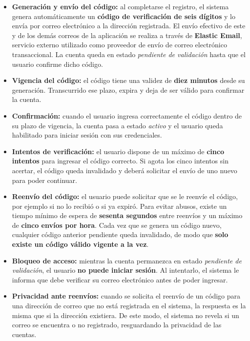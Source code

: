 \documentclass[a4paper,12pt]{article}
\begin{document}
    \begin{itemize}
        \item \textbf{Generación y envío del código:} al completarse el registro, el sistema genera automáticamente un \textbf{código de verificación de seis dígitos} y lo envía por correo electrónico a la dirección registrada. El envío efectivo de este y de los demás correos de la aplicación se realiza a través de \textbf{Elastic Email}, servicio externo utilizado como proveedor de envío de correo electrónico transaccional. La cuenta queda en estado \textit{pendiente de validación} hasta que el usuario confirme dicho código.
        \item \textbf{Vigencia del código:} el código tiene una validez de \textbf{diez minutos} desde su generación. Transcurrido ese plazo, expira y deja de ser válido para confirmar la cuenta.
        \item \textbf{Confirmación:} cuando el usuario ingresa correctamente el código dentro de su plazo de vigencia, la cuenta pasa a estado \textit{activo} y el usuario queda habilitado para iniciar sesión con sus credenciales.
        \item \textbf{Intentos de verificación:} el usuario dispone de un máximo de \textbf{cinco intentos} para ingresar el código correcto. Si agota los cinco intentos sin acertar, el código queda invalidado y deberá solicitar el envío de uno nuevo para poder continuar.
        \item \textbf{Reenvío del código:} el usuario puede solicitar que se le reenvíe el código, por ejemplo si no lo recibió o si ya expiró. Para evitar abusos, existe un tiempo mínimo de espera de \textbf{sesenta segundos} entre reenvíos y un máximo de \textbf{cinco envíos por hora}. Cada vez que se genera un código nuevo, cualquier código anterior pendiente queda invalidado, de modo que \textbf{solo existe un código válido vigente a la vez}.
        \item \textbf{Bloqueo de acceso:} mientras la cuenta permanezca en estado \textit{pendiente de validación}, el usuario \textbf{no puede iniciar sesión}. Al intentarlo, el sistema le informa que debe verificar su correo electrónico antes de poder ingresar.
        \item \textbf{Privacidad ante reenvíos:} cuando se solicita el reenvío de un código para una dirección de correo que no está registrada en el sistema, la respuesta es la misma que si la dirección existiera. De este modo, el sistema no revela si un correo se encuentra o no registrado, resguardando la privacidad de las cuentas.
    \end{itemize}
\end{document}
